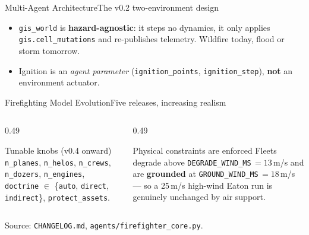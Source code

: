 \documentclass[aspectratio=169,9pt]{beamer}
\newcommand{\code}[1]{{\small\texttt{#1}}}
\newcommand{\gold}[1]{{\color{cslaeaglegold}\textbf{#1}}}
\newcommand{\srcnote}[1]{\vfill{\scriptsize\color{csladarkgray}#1}}
\begin{document}
\begin{frame}{Multi-Agent Architecture}{The v0.2 two-environment design}
  \vskip6pt
  \begin{itemize}
    \item \code{gis\_world} is \gold{hazard-agnostic}: it steps no dynamics,
          it only applies \code{gis.cell\_mutations} and re-publishes
          telemetry. Wildfire today, flood or storm tomorrow.
    \item Ignition is an \emph{agent parameter}
          (\code{ignition\_points}, \code{ignition\_step}), \textbf{not} an
          environment actuator.
  \end{itemize}
\end{frame}

\begin{frame}{Firefighting Model Evolution}{Five releases, increasing realism}
  \centering
  \vskip14pt
  \begin{columns}[T,onlytextwidth]
    \begin{column}{0.49\textwidth}
      \begin{block}{Tunable knobs (v0.4 onward)}
        \small \code{n\_planes}, \code{n\_helos}, \code{n\_crews},
        \code{n\_dozers}, \code{n\_engines},
        \code{doctrine} $\in$ \{\code{auto}, \code{direct},
        \code{indirect}\}, \code{protect\_assets}.
      \end{block}
    \end{column}
    \begin{column}{0.49\textwidth}
      \begin{alertblock}{Physical constraints are enforced}
        \small Fleets degrade above \code{DEGRADE\_WIND\_MS}\,$=13$\,m/s and
        are \gold{grounded} at \code{GROUND\_WIND\_MS}\,$=18$\,m/s --- so a
        25\,m/s high-wind Eaton run is genuinely unchanged by air support.
      \end{alertblock}
    \end{column}
  \end{columns}
  \srcnote{Source: \texttt{CHANGELOG.md}, \texttt{agents/firefighter\_core.py}.}
\end{frame}
\end{document}
